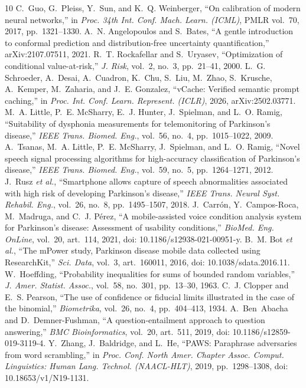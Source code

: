 \documentclass[journal]{IEEEtran}
\begin{document}
\begin{thebibliography}{10}
 C.~Guo, G.~Pleiss, Y.~Sun, and K.~Q. Weinberger, ``On calibration of modern neural networks,'' in \emph{Proc. 34th Int. Conf. Mach. Learn. (ICML)}, PMLR vol.~70, 2017, pp.~1321--1330.
 A.~N. Angelopoulos and S.~Bates, ``A gentle introduction to conformal prediction and distribution-free uncertainty quantification,'' arXiv:2107.07511, 2021.
 R.~T. Rockafellar and S.~Uryasev, ``Optimization of conditional value-at-risk,'' \emph{J. Risk}, vol.~2, no.~3, pp.~21--41, 2000.
 L.~G. Schroeder, A.~Desai, A.~Cuadron, K.~Chu, S.~Liu, M.~Zhao, S.~Krusche, A.~Kemper, M.~Zaharia, and J.~E. Gonzalez, ``vCache: Verified semantic prompt caching,'' in \emph{Proc. Int. Conf. Learn. Represent. (ICLR)}, 2026, arXiv:2502.03771.
 M.~A. Little, P.~E. McSharry, E.~J. Hunter, J.~Spielman, and L.~O. Ramig, ``Suitability of dysphonia measurements for telemonitoring of Parkinson's disease,'' \emph{IEEE Trans. Biomed. Eng.}, vol.~56, no.~4, pp.~1015--1022, 2009.
 A.~Tsanas, M.~A. Little, P.~E. McSharry, J.~Spielman, and L.~O. Ramig, ``Novel speech signal processing algorithms for high-accuracy classification of Parkinson's disease,'' \emph{IEEE Trans. Biomed. Eng.}, vol.~59, no.~5, pp.~1264--1271, 2012.
 J.~Rusz \emph{et al.}, ``Smartphone allows capture of speech abnormalities associated with high risk of developing Parkinson's disease,'' \emph{IEEE Trans. Neural Syst. Rehabil. Eng.}, vol.~26, no.~8, pp.~1495--1507, 2018.
 J.~Carr\'on, Y.~Campos-Roca, M.~Madruga, and C.~J. P\'erez, ``A mobile-assisted voice condition analysis system for Parkinson's disease: Assessment of usability conditions,'' \emph{BioMed. Eng. OnLine}, vol.~20, art.~114, 2021, doi: 10.1186/s12938-021-00951-y.
 B.~M. Bot \emph{et al.}, ``The mPower study, Parkinson disease mobile data collected using ResearchKit,'' \emph{Sci. Data}, vol.~3, art.~160011, 2016, doi: 10.1038/sdata.2016.11.
 W.~Hoeffding, ``Probability inequalities for sums of bounded random variables,'' \emph{J. Amer. Statist. Assoc.}, vol.~58, no.~301, pp.~13--30, 1963.
 C.~J. Clopper and E.~S. Pearson, ``The use of confidence or fiducial limits illustrated in the case of the binomial,'' \emph{Biometrika}, vol.~26, no.~4, pp.~404--413, 1934.
 A.~Ben~Abacha and D.~Demner-Fushman, ``A question-entailment approach to question answering,'' \emph{BMC Bioinformatics}, vol.~20, art.~511, 2019, doi: 10.1186/s12859-019-3119-4.
 Y.~Zhang, J.~Baldridge, and L.~He, ``PAWS: Paraphrase adversaries from word scrambling,'' in \emph{Proc. Conf. North Amer. Chapter Assoc. Comput. Linguistics: Human Lang. Technol. (NAACL-HLT)}, 2019, pp.~1298--1308, doi: 10.18653/v1/N19-1131.
\end{thebibliography}
\end{document}
